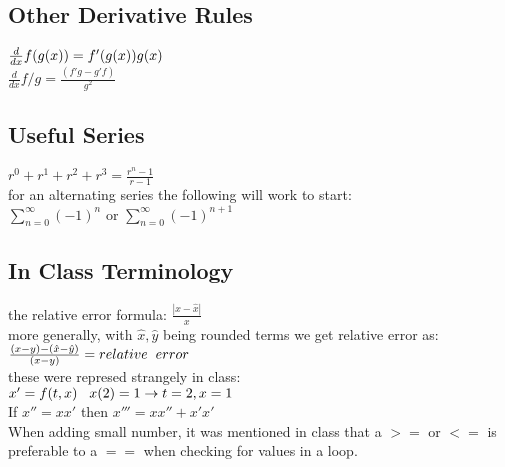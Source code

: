 \subsection*{Other Derivative Rules}
$\frac{d}{dx} f(g(x)) = f'(g(x))g(x) \hspace{1mm}$\\
$\frac{d}{dx} f/g = \frac{(f'g - g'f)}{g^2}$\\

\subsection*{Useful Series}
$r^0 + r^1 + r^2 + r^3 = \frac{r^n - 1}{r - 1}$\\
for an alternating series the following will work to start:\\
$ \sum_{n=0}^{\infty} (-1)^n $ or $ \sum_{n=0}^{\infty} (-1)^{n+1} $\\

\subsection*{In Class Terminology}
the relative error formula:
$ \frac{|x - \hat{x}|}{x} $\\
more generally, with $\hat{x},\hat{y}$ being rounded terms we get relative error as:\\
$\frac{(x-y) - (\hat{x}-\hat{y})}{(x-y)} = relative \hspace{2mm} error$\\
these were represed strangely in class:\\
$ x' = f(t,x)  \hspace{3mm} x(2) = 1 \rightarrow t = 2, x=1 $\\
If $x'' =  xx'$ then $x''' = xx'' + x'x'$\\
When adding small number, it was mentioned in class that a $>=$ or $<=$ is
preferable to a $==$ when checking for values in a loop.
